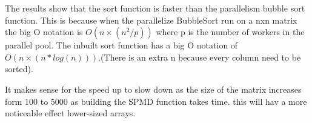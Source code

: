 The results show that the sort function is faster than the parallelism bubble sort function.
This is because when the parallelize BubbleSort run on a nxn matrix the big O notation is $O(n×(n^2/p))$ where p is the number of workers in the parallel pool. 
The inbuilt sort function has a big O notation of $O(n×(n*log(n)))$.(There is an extra n because every column need to be sorted).

It makes sense for the speed up to slow down as the size of the matrix increases form 100 to 5000 as building the SPMD function takes time. this will hav a more noticeable effect lower-sized arrays.

